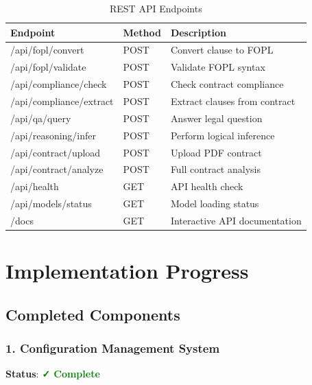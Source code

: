 \documentclass[12pt,a4paper]{article}
\begin{document}
\begin{table}[H]
\centering
\small
\begin{tabular}{|l|l|p{5cm}|}
\hline
\textbf{Endpoint} & \textbf{Method} & \textbf{Description} \\
\hline
/api/fopl/convert & POST & Convert clause to FOPL \\
/api/fopl/validate & POST & Validate FOPL syntax \\
/api/compliance/check & POST & Check contract compliance \\
/api/compliance/extract & POST & Extract clauses from contract \\
/api/qa/query & POST & Answer legal question \\
/api/reasoning/infer & POST & Perform logical inference \\
/api/contract/upload & POST & Upload PDF contract \\
/api/contract/analyze & POST & Full contract analysis \\
/api/health & GET & API health check \\
/api/models/status & GET & Model loading status \\
/docs & GET & Interactive API documentation \\
\hline
\end{tabular}
\caption{REST API Endpoints}
\end{table}

\newpage

\section{Implementation Progress}

\subsection{Completed Components}

\subsubsection{1. Configuration Management System}

\textbf{Status}: \textcolor{green}{\textbf{✓ Complete}}
\end{document}
